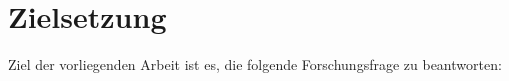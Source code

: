 



\section{Zielsetzung}
\label{sec:einletung:zielsetzung}
Ziel der vorliegenden Arbeit ist es, die folgende Forschungsfrage zu beantworten:

\forschungsfrage

